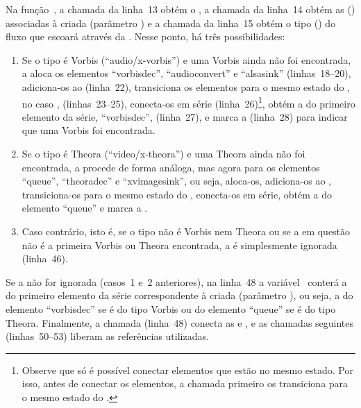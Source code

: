 \documentclass{SBCbookchapter}
\begin{document}
Na função~, a chamada da linha~13 obtém o , a
chamada da linha~14 obtém as  () associadas à
 criada (parâmetro ) e a chamada da linha~15
obtém o tipo () do fluxo que escoará através da .
Nesse ponto, há três possibilidades:
\begin{enumerate}
\item Se o tipo é Vorbis (``audio/x-vorbis'') e uma  Vorbis ainda
  não foi encontrada, a  aloca os elementos ``vorbisdec'',
  ``audioconvert'' e ``alsasink'' (linhas~18--20), adiciona-os ao
   (linha~22), transiciona os elementos para o mesmo estado do
  , no caso , (linhas~23--25), conecta-os em série
  (linha~26)\footnote{Observe que só é possível conectar elementos que estão
    no mesmo estado.  Por isso, antes de conectar os elementos, a chamada
     primeiro os
    transiciona para o mesmo estado do .}, obtém a  do primeiro elemento da série, ``vorbisdec'', (linha~27), e marca a
    (linha~28) para indicar que uma 
  Vorbis foi encontrada.
\item Se o tipo é Theora (``video/x-theora'') e uma  Theora ainda
  não foi encontrada, a  procede de forma análoga, mas agora
  para os elementos ``queue'', ``theoradec'' e ``xvimagesink'', ou seja,
  aloca-os, adiciona-os ao , transiciona-os para o mesmo estado
  do , conecta-os em série, obtém a  do elemento
  ``queue'' e marca a  .
\item Caso contrário, isto é, se o tipo não é Vorbis nem Theora ou se a
   em questão não é a primeira Vorbis ou Theora encontrada, a
   é simplesmente ignorada (linha~46).
\end{enumerate}
Se a  não for ignorada (casos~1 e~2 anteriores), na linha~48 a
variável~ conterá a  do primeiro elemento da série
correspondente à  criada (parâmetro ), ou seja,
a  do elemento ``vorbisdec'' se  é do tipo Vorbis ou
do elemento ``queue'' se  é do tipo Theora.  Finalmente, a chamada
 (linha~48) conecta as   e , e
as chamadas seguintes (linhas~50--53) liberam as referências utilizadas.


\end{document}
